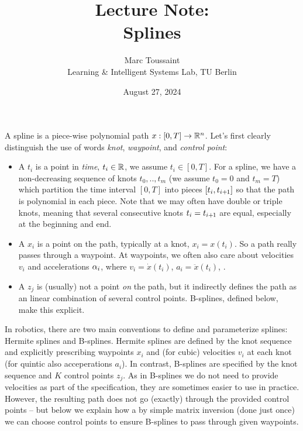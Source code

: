 
\note

\title{Lecture Note:\\ Splines}
\author{Marc Toussaint\\\small Learning \& Intelligent Systems Lab, TU Berlin}
\date{August 27, 2024}

\makeatletter
\renewcommand{\@seccntformat}[1]{}
\makeatother

\newcommand{\des}{\text{des}}
\renewcommand{\t}{\theta}
\renewcommand{\hat}{\widehat}
\newcommand{\bbg}{{\bar{\bar g}}}

\notetitle

\renewcommand{\Ref}{\text{ref}}


A spline is a piece-wise polynomial path $x:[0,T] \to {\mathbb{R}}^n$. Let's
first clearly distinguish the use of words \emph{knot},
\emph{waypoint}, and \emph{control point}:
\begin{itemize}
\item A  $t_i$ is a point in \emph{time}, $t_i \in {\mathbb{R}}$,
  we assume $t_i \in [0,T]$. For a spline, we have a non-decreasing
  sequence of knots $t_0,..,t_m$ (we assume $t_0=0$ and $t_m=T$) which
  partition the time interval $[0,T]$ into pieces $[t_i, t_{i{{\hspace*{-.0pt}\text{\rm +}\hspace*{-.5pt}}1}}]$ so
  that the path is polynomial in each piece. Note that we may often
  have double or triple knots, meaning that several consecutive knots
  $t_i = t_{i{{\hspace*{-.0pt}\text{\rm +}\hspace*{-.5pt}}1}}$ are equal, especially at the beginning and end.
\item A  $x_i$ is a point on the path, typically at a
  knot, $x_i = x(t_i)$. So a path really passes through a waypoint. At
  waypoints, we often also care about velocities $v_i$ and
  accelerations $\alpha_i$, where $v_i = \dot x(t_i)$, $a_i = \ddot x(t_i)$, .
\item A  $z_j$ is (usually) not a point \emph{on}
  the path, but it indirectly defines the path as an linear
  combination of several control points. B-splines, defined below,
  make this explicit.
\end{itemize}

In robotics, there are two main conventions to define and parameterize
splines: Hermite splines and B-splines. Hermite splines are defined by
the knot sequence and explicitly prescribing waypoints $x_i$ and (for
cubic) velocities $v_i$ at each knot (for quintic also acceperations
$a_i$). In contrast, B-splines are specified by the knot sequence and
$K$ control points $z_j$. As in B-splines we do not need to provide
velocities as part of the specification, they are sometimes easier to
use in practice. However, the resulting path does not go (exactly)
through the provided control points -- but below we explain how a
by simple matrix inversion (done just once) we can choose control
points to ensure B-splines to pass through given waypoints.


